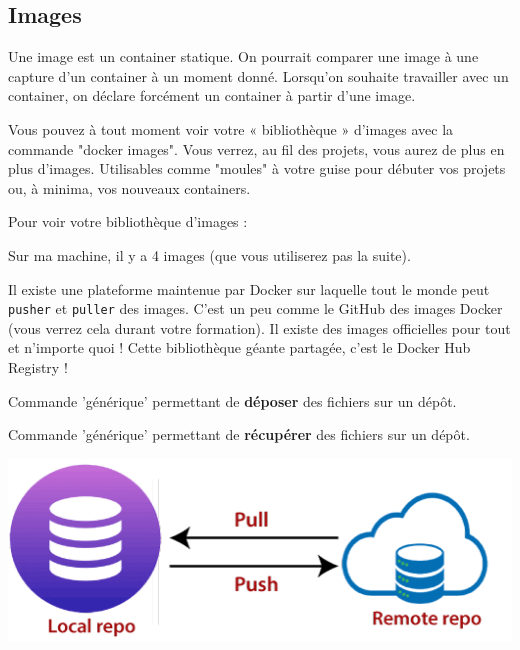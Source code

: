 \documentclass[french, 12pt]{article}%
\newcommand{\titreencadre}{Titre}
\newenvironment{encadre}[1]{\renewcommand{\titreencadre}{#1}
	\begin{mdframed}[style=encadrestyle]
	\vspace{0.5\baselineskip}
	}{%
	\end{mdframed}}
\begin{document}
\subsection{Images}

\begin{encadre}{Image}
Une image est un container statique. On pourrait comparer une image à une capture d'un container à un moment donné. Lorsqu'on souhaite travailler avec un container, on déclare forcément un container à partir d'une image.
\end{encadre}

Vous pouvez à tout moment voir votre « bibliothèque » d'images avec la commande "docker images". Vous verrez, au fil des projets, vous aurez de plus en plus d'images. Utilisables comme "moules" à votre guise pour débuter vos projets ou, à minima, vos nouveaux containers.

Pour voir votre bibliothèque d'images :


Sur ma machine, il y a 4 images (que vous utiliserez pas la suite).

\vspace{0.5cm}


Il existe une plateforme maintenue par Docker sur laquelle tout le monde peut \verb?pusher? et \verb?puller? des images. C'est un peu comme le GitHub des images Docker (vous verrez cela durant votre formation). Il existe des images officielles pour tout et n'importe quoi ! Cette bibliothèque géante partagée, c'est le Docker Hub Registry !

\begin{encadre}{Push}
Commande 'générique' permettant de \textbf{déposer} des fichiers sur un dépôt. 
\end{encadre}
\begin{encadre}{Pull}
Commande 'générique' permettant de \textbf{récupérer} des fichiers sur un dépôt. 
\end{encadre}

\begin{center}
\includegraphics[scale=0.7]{./ressource/pull_push.png}
\end{center}
\end{document}
